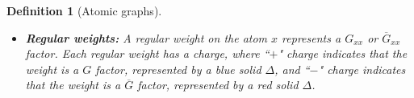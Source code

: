 \documentclass{article}
\newcommand{\1}{\mathds{1}}
\numberwithin{equation}{section}
\newcommand{\al}{\alpha}
\newcommand{\be}{\begin{equation}}
\newcommand{\ee}{\end{equation}}
\renewcommand{\cal}{\mathcal}
\theoremstyle{plain} %
\newtheorem{definition}[theorem]{Definition}
\theoremstyle{remark}
\begin{document}
\begin{definition}[Atomic graphs]
\begin{itemize}
\item {\bf Regular weights:}  A regular weight on the atom $x $ represents a $G_{xx}$ or $\overline G_{xx}$ factor. 
 Each regular weight has a charge, where ``$+$" charge indicates that the weight is a $G$ factor, represented by a blue solid $\Delta$, and ``$-$" charge indicates that the weight is a $\overline G$ factor, represented by a red solid $\Delta$. %
%
%


\end{itemize}
\end{definition}
\end{document}
